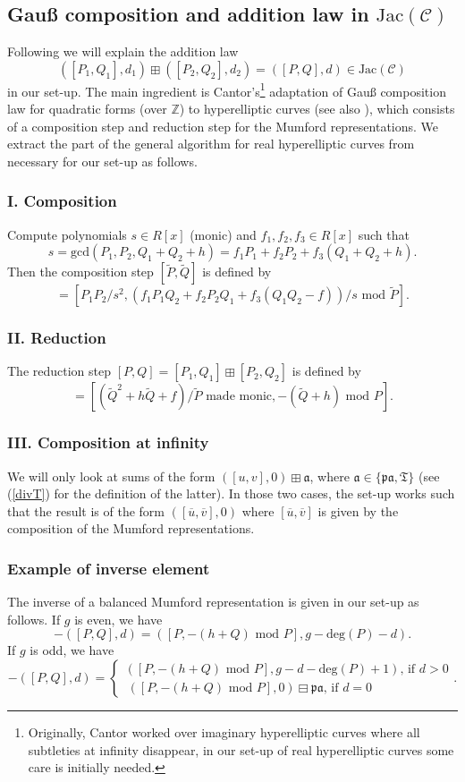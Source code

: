 \documentclass[11pt, a4paper]{amsart}
\newcommand{\jac}{\mathrm{Jac(\mathcal C)}}
\newcommand{\eqst}[1]{\begin{equation*}#1\end{equation*}}
\theoremstyle{plain}
\numberwithin{equation}{section}
\begin{document}
\subsection{Gauß composition and addition law in $\jac$}
\label{gausscomp}
Following \cite{galbraith} we will explain the addition law \eqst{([P_1,Q_1],d_1)\boxplus ([P_2,Q_2],d_2) = ([P,Q],d) \in \jac} in our set-up. The main ingredient is Cantor's\footnote{Originally, Cantor worked over imaginary hyperelliptic curves where all subtleties at infinity disappear, in our set-up of real hyperelliptic curves some care is initially needed.} adaptation \cite{cantorjacobian} of Gauß composition law for quadratic forms (over $\mathbb Z$) to hyperelliptic curves (see also \cite{wood}), which consists of a composition step and reduction step for the Mumford representations. We extract the part of the general algorithm for real hyperelliptic curves from \cite{galbraith} necessary for our set-up as follows.

\subsubsection*{I. Composition}
Compute polynomials $s \in R[x]$ (monic) and $f_1,f_2,f_3 \in R[x]$ such that \eqst{s = \mathrm{gcd}(P_1,P_2,Q_1+Q_2+h) = f_1 P_1 + f_2 P_2 + f_3 (Q_1+Q_2+h).}
Then the composition step $[\tilde P,\tilde Q]$ 
is defined by \eqst{ [\tilde P, \tilde Q] = [P_1 P_2 / s^2, (f_1 P_1 Q_2 + f_2 P_2 Q_1 + f_3(Q_1 Q_2 -f))/s \text{ mod } \tilde P].}
\subsubsection*{II. Reduction}
The reduction step $[P,Q] = [P_1,Q_1]\boxplus[P_2,Q_2] $ is defined by \eqst{[P,Q] = [(\tilde Q ^2+h \tilde Q + f )/\tilde P \text{ made monic}, -(\tilde Q + h) \text{ mod } P ].}
\subsubsection*{III. Composition at infinity}
We will only look at sums of the form $([u,v],0) \boxplus \mathfrak a$, where $\mathfrak a \in \{\mathfrak{pa},\mathfrak T\}$ (see (\ref{divT}) for the definition of the latter). In those two cases, the set-up works such that the result is of the form $([\overline u,\overline v],0)$ where $[\overline u ,\overline v]$ is given by the composition of the Mumford representations.
\subsubsection{Example of inverse element}
The inverse of a balanced Mumford representation is given in our set-up as follows. If $g$ is even, we have \eqst{-([P,Q],d) = ([P,-(h+Q) \text{ mod } P],g-\mathrm{deg}(P)-d).} If $g$ is odd, we have \eqst{-([P,Q],d) =  \left\{ \begin{array}{c} ([P,-(h+Q) \text{ mod } P],g-d-\mathrm{deg}(P)+1) \text{, if $d>0$} \\  \  ([P,-(h+Q) \text{ mod } P],0)\boxminus \mathfrak{pa} \text{, if $d=0$}  \end{array} . \right.}
\end{document}
